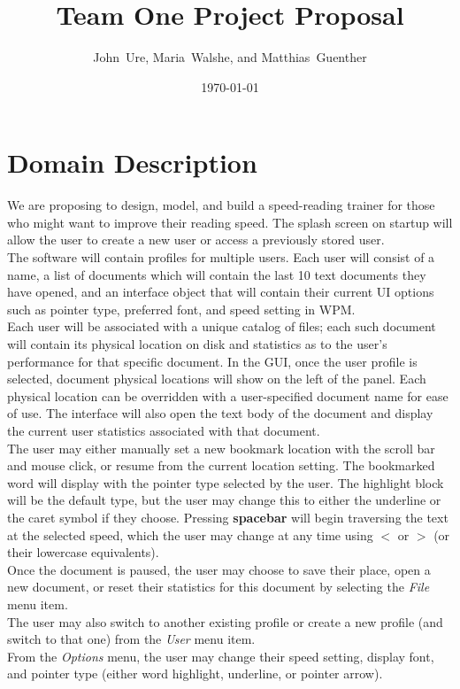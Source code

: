 \documentclass{article}
\begin{document}
\title{Team One Project Proposal}
\author{John~Ure, Maria~Walshe, and Matthias~Guenther}
\date{\today}
\maketitle

\clearpage

\section*{Domain Description}{

	We are proposing to design, model, and build a speed-reading trainer for those who might want to improve their reading speed. The splash screen on startup will allow the user to create a new user or access a previously stored user.\\

	The software will contain profiles for multiple users. Each user will consist of a name, a list of documents which will contain the last 10 text documents they have opened, and an interface object that will contain their current UI options such as pointer type, preferred font, and speed setting in WPM.\\

	Each user will be associated with a unique catalog of files; each such document will contain its physical location on disk and statistics as to the user's performance for that specific document. In the GUI, once the user profile is selected, document physical locations will show on the left of the panel. Each physical location can be overridden with a user-specified document name for ease of use. The interface will also open the text body of the document and display the current user statistics associated with that document.\\

	The user may either manually set a new bookmark location with the scroll bar and mouse click, or resume from the current location setting. The bookmarked word will display with the pointer type selected by the user. The highlight block will be the default type, but the user may change this to either the underline or the caret symbol if they choose. Pressing \textbf{spacebar} will begin traversing the text at the selected speed, which the user may change at any time using $\boldsymbol{<}$ or $\boldsymbol{>}$ (or their lowercase equivalents).\\

	Once the document is paused, the user may choose to save their place, open a new document, or reset their statistics for this document by selecting the \textit{File} menu item.\\

	The user may also switch to another existing profile or create a new profile (and switch to that one) from the \textit{User} menu item.\\

	From the \textit{Options} menu, the user may change their speed setting, display font, and pointer type (either word highlight, underline, or pointer arrow).\\
}
\end{document}
